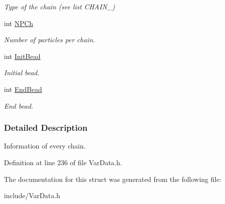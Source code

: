 \begin{DoxyCompactItemize}
\begin{DoxyCompactList}\small\item\em Type of the chain (see list C\+H\+A\+I\+N\+\_\+) \end{DoxyCompactList}\item 
int \hyperlink{structCHAIN_a521663d12899e0fefe0a182332a8573f}{N\+P\+Ch}\hypertarget{structCHAIN_a521663d12899e0fefe0a182332a8573f}{}\label{structCHAIN_a521663d12899e0fefe0a182332a8573f}

\begin{DoxyCompactList}\small\item\em Number of particles per chain. \end{DoxyCompactList}\item 
int \hyperlink{structCHAIN_ae42336bc0bf033452fba9451cf1e9bc5}{Init\+Bead}\hypertarget{structCHAIN_ae42336bc0bf033452fba9451cf1e9bc5}{}\label{structCHAIN_ae42336bc0bf033452fba9451cf1e9bc5}

\begin{DoxyCompactList}\small\item\em Initial bead. \end{DoxyCompactList}\item 
int \hyperlink{structCHAIN_a3d5741424865c77e0404a26fe8d11b94}{End\+Bead}\hypertarget{structCHAIN_a3d5741424865c77e0404a26fe8d11b94}{}\label{structCHAIN_a3d5741424865c77e0404a26fe8d11b94}

\begin{DoxyCompactList}\small\item\em End bead. \end{DoxyCompactList}\end{DoxyCompactItemize}


\subsubsection{Detailed Description}
Information of every chain. 

Definition at line 236 of file Var\+Data.\+h.



The documentation for this struct was generated from the following file\+:\begin{DoxyCompactItemize}
\item 
include/Var\+Data.\+h\end{DoxyCompactItemize}
